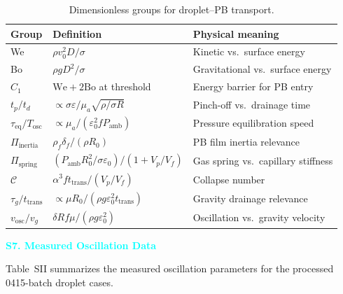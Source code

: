 \documentclass[%
 preprint,
 superscriptaddress,
 amsmath,amssymb,
 aps, prl,
]{revtex4-2}
\begin{document}
\begin{table}[ht]
\caption{Dimensionless groups for droplet--PB transport.}
\label{tab:dimensionless}
\begin{ruledtabular}
\begin{tabular}{lll}
\textbf{Group} & \textbf{Definition} & \textbf{Physical meaning} \\
\hline
We  & $\rho v_0^2 D / \sigma$ & Kinetic vs.\ surface energy \\
Bo  & $\rho g D^2 / \sigma$   & Gravitational vs.\ surface energy \\
$C_1$ & $\text{We}+2\text{Bo}$ at threshold & Energy barrier for PB entry \\
$t_p/t_d$ & $\propto \sigma\varepsilon/\mu_a\sqrt{\rho/\sigma R}$ & Pinch-off vs.\ drainage time \\
$\tau_{\text{eq}}/T_{\text{osc}}$ & $\propto \mu_a/(\varepsilon_0^2 f P_{\text{amb}})$ & Pressure equilibration speed \\
$\Pi_{\text{inertia}}$ & $\rho_f\delta_f/(\rho R_0)$ & PB film inertia relevance \\
$\Pi_{\text{spring}}$ & $(P_{\text{amb}}R_0^2/\sigma\varepsilon_0)/(1+V_p/V_f)$ & Gas spring vs.\ capillary stiffness \\
$\mathcal{C}$ & $\alpha^3 f t_{\text{trans}}/(V_p/V_f)$ & Collapse number \\
$\tau_g/t_{\text{trans}}$ & $\propto \mu R_0/(\rho g\varepsilon_0^2 t_{\text{trans}})$ & Gravity drainage relevance \\
$v_{\text{osc}}/v_g$ & $\delta R f \mu/(\rho g\varepsilon_0^2)$ & Oscillation vs.\ gravity velocity \\
\hline
\end{tabular}
\end{ruledtabular}
\end{table}

\textcolor{cyan}{\textbf{S7. Measured Oscillation Data}}\par

Table~SII summarizes the measured oscillation parameters for the processed 0415-batch droplet cases.
\end{document}
